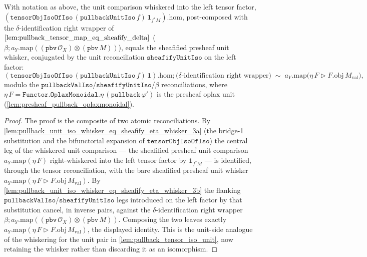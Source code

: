 \begin{lemma}

  \label{lem:pullback_unit_iso_whisker_eq_sheafify_eta_whisker}
  With notation as above, the unit comparison whiskered into the left tensor factor,
  \((\mathtt{tensorObjIsoOfIso}\,(\mathtt{pullbackUnitIso}\,f)\,\mathbf 1_{f^{*}M}).\mathrm{hom}\),
  post-composed with the \(\delta\)-identification right wrapper of
  \(\cref{lem:pullback_tensor_map_eq_sheafify_delta}\)
  (\(\beta \mathbin{;} a_Y.\mathrm{map}((\mathtt{pbv}\,\mathcal{O}_X)\otimes(\mathtt{pbv}\,M))\)),
  equals the sheafified presheaf unit whisker, conjugated by the unit reconciliation
  \(\mathtt{sheafifyUnitIso}\) on the left factor:
  \[
    (\mathtt{tensorObjIsoOfIso}\,(\mathtt{pullbackUnitIso}\,f)\,\mathbf 1).\mathrm{hom}
      \mathbin{;} \bigl(\delta\text{-identification right wrapper}\bigr)
    \;\sim\;
    a_Y.\mathrm{map}\bigl(\eta\,F \rhd F.\mathrm{obj}\,M_{\mathrm{val}}\bigr),
  \]
  modulo the \(\mathtt{pullbackValIso}\)/\(\mathtt{sheafifyUnitIso}\)/\(\beta\) reconciliations, where
  \(\eta\,F = \mathtt{Functor.OplaxMonoidal.}\eta\,(\mathtt{pullback}\,\varphi')\) is the presheaf
  oplax unit (\cref{lem:presheaf_pullback_oplaxmonoidal}).
\end{lemma}
\begin{proof}
  The proof is the composite of two atomic reconciliations. By
  \cref{lem:pullback_unit_iso_whisker_eq_sheafify_eta_whisker_3a} (the bridge-1 substitution and the
  bifunctorial expansion of \(\mathtt{tensorObjIsoOfIso}\)) the central leg of the whiskered unit
  comparison --- the sheafified presheaf unit comparison \(a_Y.\mathrm{map}(\eta\,F)\) right-whiskered
  into the left tensor factor by \(\mathbf 1_{f^{*}M}\) --- is identified, through the tensor
  reconciliation, with the bare sheafified presheaf unit whisker
  \(a_Y.\mathrm{map}(\eta\,F \rhd F.\mathrm{obj}\,M_{\mathrm{val}})\). By
  \cref{lem:pullback_unit_iso_whisker_eq_sheafify_eta_whisker_3b} the flanking
  \(\mathtt{pullbackValIso}\)/\(\mathtt{sheafifyUnitIso}\) legs introduced on the left factor by that
  substitution cancel, in inverse pairs, against the \(\delta\)-identification right wrapper
  \(\beta \mathbin{;} a_Y.\mathrm{map}((\mathtt{pbv}\,\mathcal{O}_X)\otimes(\mathtt{pbv}\,M))\).
  Composing the two leaves exactly \(a_Y.\mathrm{map}(\eta\,F \rhd F.\mathrm{obj}\,M_{\mathrm{val}})\),
  the displayed identity. This is the unit-side analogue of the whiskering for the unit pair in
  \cref{lem:pullback_tensor_iso_unit}, now retaining the whisker rather than discarding it as an
  isomorphism.
\end{proof}

